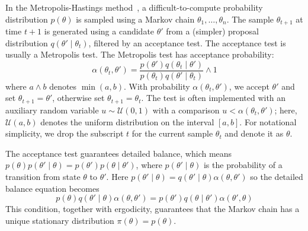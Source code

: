 \documentclass{article}
\begin{document}
In the Metropolis-Hastings method~\cite{gilks1996markov,brooks2011handbook}, a
difficult-to-compute probability distribution $p(\theta)$ is sampled using a
Markov chain $\theta_1,\ldots,\theta_n$. The sample $\theta_{t+1}$ at time $t+1$
is generated using a candidate $\theta'$ from a (simpler) proposal distribution
$q(\theta'\mid \theta_t)$, filtered by an acceptance test. The acceptance test
is usually a Metropolis test. The Metropolis test has acceptance probability:
\begin{equation}\label{eq:traditional}
    \alpha(\theta_t,\theta') = \frac{p(\theta')q(\theta_t \mid \theta')}{p(\theta_t)q(\theta' \mid \theta_t)} \wedge 1
\end{equation}
where $a \wedge b$ denotes $\min(a,b)$.  With probability
$\alpha(\theta_t,\theta')$, we accept $\theta'$ and set $\theta_{t+1} =
\theta'$, otherwise set $\theta_{t+1}=\theta_t$.  The test is often implemented
with an auxiliary random variable $u \sim \mathcal{U}(0,1)$ with a comparison
$u<\alpha(\theta_t,\theta')$; here, $\mathcal{U}(a,b)$ denotes the uniform
distribution on the interval $[a,b]$.  For notational simplicity, we drop the
subscript $t$ for the current sample $\theta_t$ and denote it as $\theta$. 

The acceptance test guarantees detailed balance, which means
$p(\theta)p(\theta'\mid\theta) = p(\theta')p(\theta \mid\theta')$,
where $p(\theta'\mid\theta)$ is the probability of a transition from state
$\theta$ to $\theta'$. Here $p(\theta'\mid\theta) =
q(\theta'\mid\theta)\alpha(\theta,\theta')$ so the detailed balance equation
becomes
\begin{equation}\label{eq:detailed_balance2}
    p(\theta)q(\theta'\mid\theta)\alpha(\theta,\theta') = p(\theta')q(\theta\mid\theta')\alpha(\theta',\theta)
\end{equation}
This condition, together with ergodicity, guarantees that the Markov chain has a
unique stationary distribution $\pi(\theta) = p(\theta)$.
\end{document}
